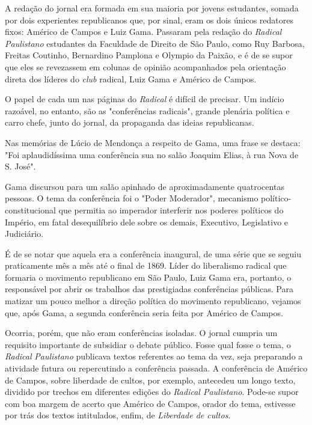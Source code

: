 A redação do jornal era formada em sua maioria por jovens estudantes,
somada por dois experientes republicanos que, por sinal, eram os dois
únicos redatores fixos: Américo de Campos e Luiz Gama. Passaram pela
redação do \emph{Radical Paulistano} estudantes da Faculdade de Direito
de São Paulo, como Ruy Barbosa, Freitas Coutinho, Bernardino Pamplona e
Olympio da Paixão, e é de se supor que eles se revezassem em colunas de
opinião acompanhados pela orientação direta dos líderes do \emph{club}
radical, Luiz Gama e Américo de Campos.

O papel de cada um nas páginas do \emph{Radical} é difícil de precisar.
Um indício razoável, no entanto, são as "conferências radicais", grande
plenária política e carro chefe, junto do jornal, da propaganda das
ideias republicanas.

Nas memórias de Lúcio de Mendonça a respeito de Gama, uma frase se
destaca: "Foi aplaudidíssima uma conferência sua no salão Joaquim Elias,
à rua Nova de S. José".

Gama discursou para um salão apinhado de aproximadamente quatrocentas
pessoas. O tema da conferência foi o "Poder Moderador", mecanismo
político-constitucional que permitia ao imperador interferir nos poderes
políticos do Império, em fatal desequilíbrio dele sobre os demais,
Executivo, Legislativo e Judiciário.

É de se notar que aquela era a conferência inaugural, de uma série que
se seguiu praticamente mês a mês até o final de 1869. Líder do
liberalismo radical que formaria o movimento republicano em São Paulo,
Luiz Gama era, portanto, o responsável por abrir os trabalhos das
prestigiadas conferências públicas. Para matizar um pouco melhor a
direção política do movimento republicano, vejamos que, após Gama, a
segunda conferência seria feita por Américo de Campos.

Ocorria, porém, que não eram conferências isoladas. O jornal cumpria um
requisito importante de subsidiar o debate público. Fosse qual fosse o
tema, o \emph{Radical} \emph{Paulistano} publicava textos referentes ao
tema da vez, seja preparando a atividade futura ou repercutindo a
conferência passada. A conferência de Américo de Campos, sobre liberdade
de cultos, por exemplo, antecedeu um longo texto, dividido por trechos
em diferentes edições do \emph{Radical Paulistano}. Pode-se supor com
boa margem de acerto que Américo de Campos, orador do tema, estivesse
por trás dos textos intitulados, enfim, de \emph{Liberdade de cultos}.


